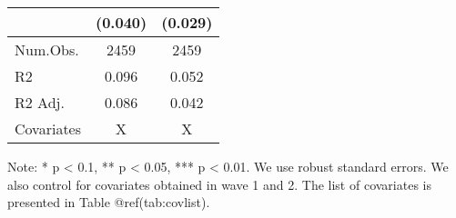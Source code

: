 \begin{table}
\begin{threeparttable}
\begin{tabular}[t]{lcc}
 & (\num{0.040}) & (\num{0.029})\\
\midrule
Num.Obs. & \num{2459} & \num{2459}\\
R2 & \num{0.096} & \num{0.052}\\
R2 Adj. & \num{0.086} & \num{0.042}\\
Covariates & X & X\\
\bottomrule
\end{tabular}
\begin{tablenotes}
\item Note: * p < 0.1, ** p < 0.05, *** p < 0.01. We use robust standard errors. We also control for covariates obtained in wave 1 and 2. The list of covariates is presented in Table @ref(tab:covlist).
\end{tablenotes}
\end{threeparttable}
\end{table}

